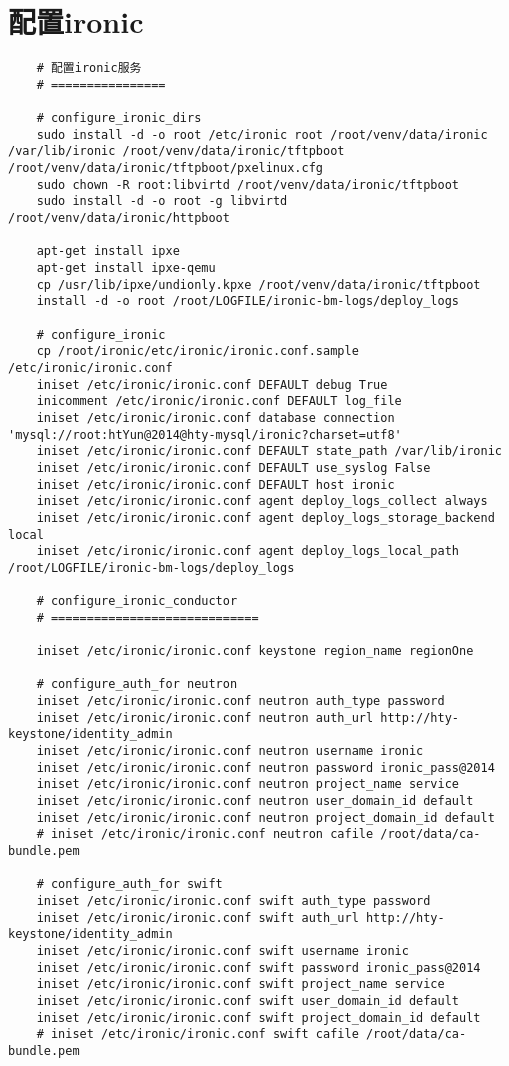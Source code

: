 \documentclass[a4paper,left=2.5cm,right=2.5cm,11pt]{article}
\begin{document}
\section{配置ironic}
	\begin{lstlisting}
	# 配置ironic服务
	# ================

	# configure_ironic_dirs
	sudo install -d -o root /etc/ironic root /root/venv/data/ironic /var/lib/ironic /root/venv/data/ironic/tftpboot /root/venv/data/ironic/tftpboot/pxelinux.cfg
	sudo chown -R root:libvirtd /root/venv/data/ironic/tftpboot
	sudo install -d -o root -g libvirtd /root/venv/data/ironic/httpboot

	apt-get install ipxe
	apt-get install ipxe-qemu
	cp /usr/lib/ipxe/undionly.kpxe /root/venv/data/ironic/tftpboot
	install -d -o root /root/LOGFILE/ironic-bm-logs/deploy_logs

	# configure_ironic
	cp /root/ironic/etc/ironic/ironic.conf.sample /etc/ironic/ironic.conf
	iniset /etc/ironic/ironic.conf DEFAULT debug True
	inicomment /etc/ironic/ironic.conf DEFAULT log_file
	iniset /etc/ironic/ironic.conf database connection 'mysql://root:htYun@2014@hty-mysql/ironic?charset=utf8'
	iniset /etc/ironic/ironic.conf DEFAULT state_path /var/lib/ironic
	iniset /etc/ironic/ironic.conf DEFAULT use_syslog False
	iniset /etc/ironic/ironic.conf DEFAULT host ironic
	iniset /etc/ironic/ironic.conf agent deploy_logs_collect always
	iniset /etc/ironic/ironic.conf agent deploy_logs_storage_backend local
	iniset /etc/ironic/ironic.conf agent deploy_logs_local_path /root/LOGFILE/ironic-bm-logs/deploy_logs

	# configure_ironic_conductor
	# =============================

	iniset /etc/ironic/ironic.conf keystone region_name regionOne

	# configure_auth_for neutron
	iniset /etc/ironic/ironic.conf neutron auth_type password
	iniset /etc/ironic/ironic.conf neutron auth_url http://hty-keystone/identity_admin
	iniset /etc/ironic/ironic.conf neutron username ironic
	iniset /etc/ironic/ironic.conf neutron password ironic_pass@2014
	iniset /etc/ironic/ironic.conf neutron project_name service
	iniset /etc/ironic/ironic.conf neutron user_domain_id default
	iniset /etc/ironic/ironic.conf neutron project_domain_id default
	# iniset /etc/ironic/ironic.conf neutron cafile /root/data/ca-bundle.pem

	# configure_auth_for swift
	iniset /etc/ironic/ironic.conf swift auth_type password
	iniset /etc/ironic/ironic.conf swift auth_url http://hty-keystone/identity_admin
	iniset /etc/ironic/ironic.conf swift username ironic
	iniset /etc/ironic/ironic.conf swift password ironic_pass@2014
	iniset /etc/ironic/ironic.conf swift project_name service
	iniset /etc/ironic/ironic.conf swift user_domain_id default
	iniset /etc/ironic/ironic.conf swift project_domain_id default
	# iniset /etc/ironic/ironic.conf swift cafile /root/data/ca-bundle.pem


\end{lstlisting}
\end{document}
